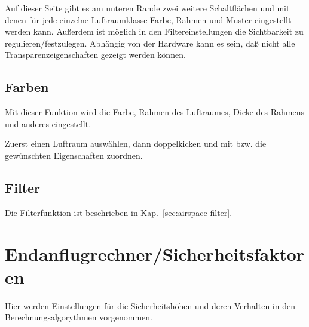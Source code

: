 Auf dieser Seite gibt es am unteren Rande zwei weitere Schaltflächen   und
  mit denen für jede einzelne Luftraumklasse Farbe, Rahmen und Muster
 eingestellt werden kann.
 Außerdem ist möglich in den Filtereinstellungen die Sichtbarkeit zu regulieren/festzulegen.
Abhängig von der Hardware kann es sein, daß nicht alle Transparenzeigenschaften gezeigt
werden können.

\subsection*{Farben}
Mit dieser Funktion wird die Farbe, Rahmen des Luftraumes,  Dicke des Rahmens und
anderes eingestellt.

Zuerst einen Luftraum auswählen, dann doppelkicken und mit   bzw.
 die gewünschten Eigenschaften zuordnen.

\subsection*{Filter}
Die Filterfunktion ist beschrieben in Kap.~\ref{sec:airspace-filter}.


\section{Endanflugrechner/Sicherheitsfaktoren}
Hier werden Einstellungen für die Sicherheitshöhen und deren Verhalten in den Berechnungsalgorythmen vorgenommen.


